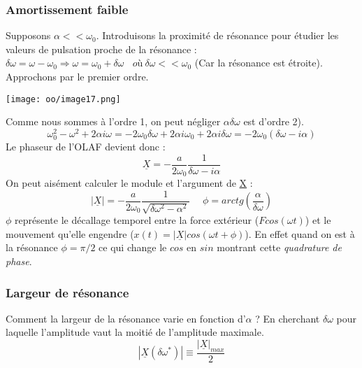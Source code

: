 \documentclass[british,french,11pt, a4paper, openany]{book}
\begin{document}
	\subsubsection{Amortissement faible}
	Supposons $\alpha << \omega_0$. Introduisons la proximité de résonance pour étudier les valeurs de pulsation proche de la résonance : $\delta\omega = \omega - \omega_0 \Rightarrow \omega = \omega_0 + \delta\omega\ \ \ \ où\ \delta\omega << \omega_0$ (Car la résonance est étroite).\\
	Approchons par le premier ordre.
	\begin{center}
		\texttt{[image: oo/image17.png]}
	\end{center}
	Comme nous sommes à l'ordre 1, on peut négliger $\alpha\delta\omega$ est d'ordre 2).
	\begin{equation}
		\omega_0^2 - \omega^2 + 2\alpha i \omega = -2\omega_0\delta\omega + 2\alpha i\omega_0 + 2 \alpha i\delta\omega =  -2\omega_0(\delta\omega - i\alpha)
	\end{equation}
	Le phaseur de l'OLAF devient donc :
	\begin{equation}
		\underline{X} = -\frac{a}{2\omega_0}\frac{1}{\delta\omega - i\alpha}
	\end{equation}
	On peut aisément calculer le module et l'argument de \underline{X} :
	\begin{equation}
		|\underline{X}| = -\frac{a}{2\omega_0}\frac{1}{\sqrt{\delta\omega^2 - \alpha^2}}\ \ \ \ \ \ \phi = arctg\left(\frac{\alpha}{\delta\omega}\right)
	\end{equation}
	$\phi$ représente le décallage temporel entre la force extérieur ($Fcos(\omega t)$) et le mouvement qu'elle engendre ($x(t) = |\underline{X}|cos(\omega t + \phi)$). En effet quand on est à la résonance $\phi = \pi/2$ ce qui change le $cos$ en $sin$ montrant cette \textit{quadrature de phase}.
	
	\subsubsection{Largeur de résonance}
	Comment la largeur de la résonance varie en fonction d'$\alpha$ ? En cherchant $\delta\omega$ pour laquelle l'amplitude vaut la moitié de l'amplitude maximale.
	\begin{equation}
		|\underline{X}(\delta\omega^*)| \equiv \frac{|\underline{X}|_{max}}{2}
	\end{equation}
	
\end{document}
